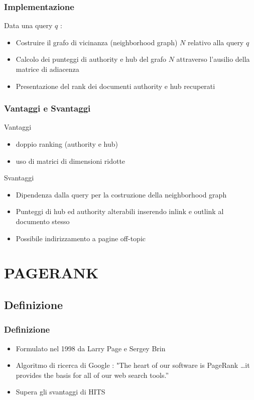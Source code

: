 \documentclass{beamer}
\begin{document}
\begin{frame}
	\frametitle{Implementazione}
	Data una query $q$ :
	\begin{itemize}
		\item Costruire il grafo di vicinanza (neighborhood graph) $N$ relativo alla query $q$
		\item Calcolo dei punteggi di authority e hub del grafo $N$ attraverso l'ausilio della matrice di adiacenza
		\item Presentazione del rank dei documenti authority e hub recuperati
	\end{itemize}
\end{frame}

\begin{frame}
	\frametitle{Vantaggi e Svantaggi}
	Vantaggi
	\begin{itemize}
		\item doppio ranking (authority e hub)
		\item uso di matrici di dimensioni ridotte \\
	\end{itemize}
	Svantaggi
	\begin{itemize}
		\item Dipendenza dalla query per la costruzione della neighborhood graph
		\item Punteggi di hub ed authority alterabili inserendo inlink e outlink al documento stesso
		\item Possibile indirizzamento a pagine off-topic
	\end{itemize}
\end{frame}

\section{PAGERANK}

\subsection{Definizione}
\begin{frame}
	\frametitle{Definizione}
	\begin{itemize}
		\item Formulato nel 1998 da Larry Page e Sergey Brin
		\item Algoritmo di ricerca di Google : "The heart of our software is PageRank \texttrademark\dots it provides the basis for all of our web search tools.''
		\item Supera gli svantaggi di HITS
	\end{itemize}
\end{frame}
\end{document}
